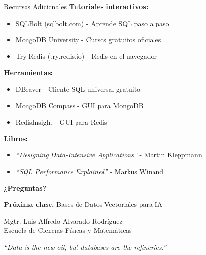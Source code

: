 \documentclass[aspectratio=169]{beamer}
\begin{document}
\begin{frame}{Recursos Adicionales}
    \textbf{Tutoriales interactivos:}
    \begin{itemize}
        \item SQLBolt (sqlbolt.com) - Aprende SQL paso a paso
        \item MongoDB University - Cursos gratuitos oficiales
        \item Try Redis (try.redis.io) - Redis en el navegador
    \end{itemize}
    
    \vspace{0.3cm}
    \textbf{Herramientas:}
    \begin{itemize}
        \item DBeaver - Cliente SQL universal gratuito
        \item MongoDB Compass - GUI para MongoDB
        \item RedisInsight - GUI para Redis
    \end{itemize}
    
    \vspace{0.3cm}
    \textbf{Libros:}
    \begin{itemize}
        \item \textit{``Designing Data-Intensive Applications''} - Martin Kleppmann
        \item \textit{``SQL Performance Explained''} - Markus Winand
    \end{itemize}
\end{frame}

\begin{frame}
    \centering
    \Huge \textbf{¿Preguntas?}
    
    \vspace{0.8cm}
    \large
    \textbf{Próxima clase:} Bases de Datos Vectoriales para IA
    
    \vspace{0.5cm}
    \normalsize
    Mgtr. Luis Alfredo Alvarado Rodríguez\\
    \small Escuela de Ciencias Físicas y Matemáticas
    
    \vspace{0.5cm}
    \footnotesize
    \textit{``Data is the new oil, but databases are the refineries.''}
\end{frame}
\end{document}
